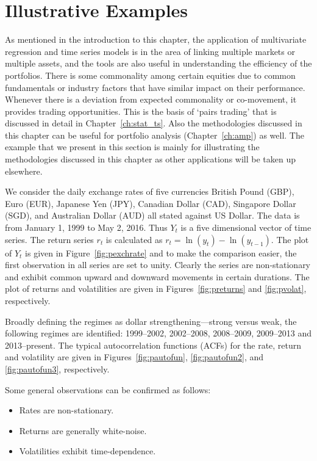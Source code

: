 \section{Illustrative Examples}


As mentioned in the introduction to this chapter, the application of multivariate regression and time series models is in the area of linking multiple markets or multiple assets, and the tools are also useful in understanding the efficiency of the portfolios. There is some commonality among certain equities due to common fundamentals or industry factors that have similar impact on their performance. Whenever there is a deviation from expected commonality or co-movement, it provides trading opportunities. This is the basis of `pairs trading' that is discussed in detail in Chapter~\ref{ch:stat_ts}. Also the methodologies discussed in this chapter can be useful for portfolio analysis (Chapter~\ref{ch:amp}) as well. The example that we present in this section is mainly for illustrating the methodologies discussed in this chapter as other applications will be taken up elsewhere.


We consider the daily exchange rates of five currencies British Pound (GBP), Euro (EUR), Japanese Yen (JPY), Canadian Dollar (CAD), Singapore Dollar (SGD), and Australian Dollar (AUD) all stated against US Dollar. The data is from January 1, 1999 to May 2, 2016. Thus $Y_t$ is a five dimensional vector of time series. The return series $r_t$ is calculated as $r_t= \ln(y_t) - \ln(y_{t-1})$. The plot of $Y_t$ is given in Figure~\ref{fig:pexchrate} and to make the comparison easier, the first observation in all series are set to unity. Clearly the series are non-stationary and exhibit common upward and downward movements in certain durations. The plot of returns and volatilities are given in Figures~\ref{fig:preturns} and \ref{fig:pvolat}, respectively. 


Broadly defining the regimes as dollar strengthening---strong versus weak, the following regimes are identified: 1999--2002, 2002--2008, 2008--2009, 2009--2013 and 2013--present. The typical autocorrelation functions (ACFs) for the rate, return and volatility are given in Figures~\ref{fig:pautofun}, \ref{fig:pautofun2}, and \ref{fig:pautofun3}, respectively.


Some general observations can be confirmed as follows:
	\begin{itemize}
	\item Rates are non-stationary.
	\item Returns are generally white-noise.
	\item Volatilities exhibit time-dependence.
	\end{itemize}


